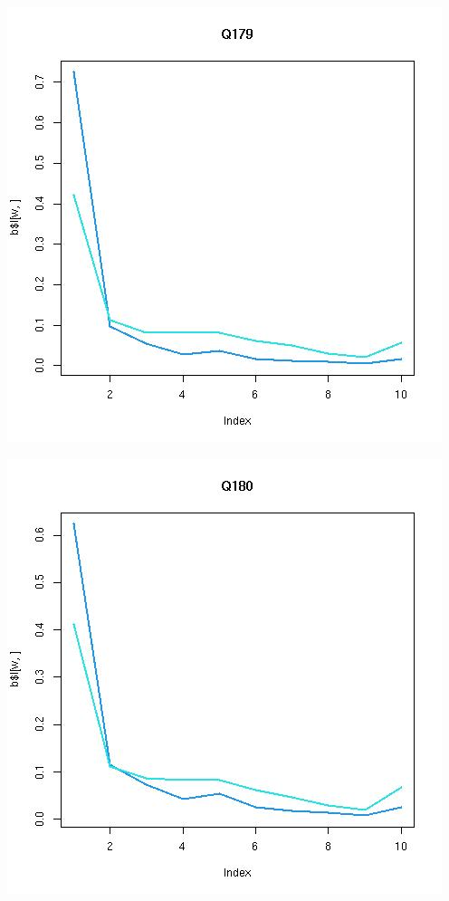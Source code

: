 \documentclass{amsart}
\begin{document}
\includegraphics[scale=0.6]{fitQ179.jpeg}

\includegraphics[scale=0.6]{fitQ180.jpeg}
\end{document}
